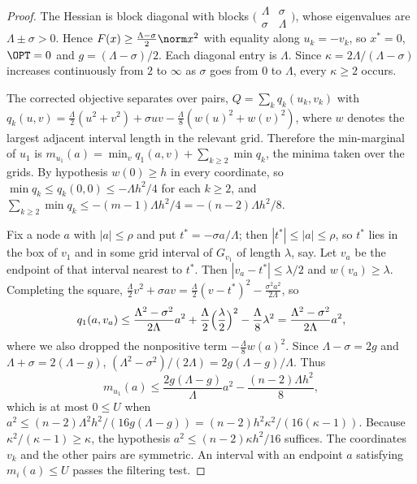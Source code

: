 \begin{proof}
The Hessian is block diagonal with blocks
$\bigl(\begin{smallmatrix}\Lambda&\sigma\\\sigma&\Lambda\end{smallmatrix}\bigr)$,
whose eigenvalues are $\Lambda\pm\sigma>0$. Hence $F(x)\ge\frac{\Lambda-\sigma}2
\norm x^2$ with equality along $u_k=-v_k$, so $x^*=0$, $\OPT=0$ and
$g=(\Lambda-\sigma)/2$. Each diagonal entry is $\Lambda$. Since
$\kappa=2\Lambda/(\Lambda-\sigma)$ increases continuously from $2$ to
$\infty$ as $\sigma$ goes from $0$ to $\Lambda$, every $\kappa\ge2$ occurs.

The corrected objective separates over pairs,
$Q=\sum_kq_k(u_k,v_k)$ with
$q_k(u,v)=\frac\Lambda2(u^2+v^2)+\sigma uv-\frac\Lambda8(w(u)^2+w(v)^2)$,
where $w$ denotes the largest adjacent interval length in the relevant
grid. Therefore the min-marginal of $u_1$ is
$m_{u_1}(a)=\min_vq_1(a,v)+\sum_{k\ge2}\min q_k$, the minima taken over the
grids. By hypothesis $w(0)\ge h$ in every coordinate, so
$\min q_k\le q_k(0,0)\le-\Lambda h^2/4$ for each $k\ge2$, and
$\sum_{k\ge2}\min q_k\le-(m-1)\Lambda h^2/4=-(n-2)\Lambda h^2/8$.

Fix a node $a$ with $|a|\le\rho$ and put $t^*=-\sigma a/\Lambda$; then
$|t^*|\le|a|\le\rho$, so $t^*$ lies in the box of $v_1$ and in some grid
interval of $G_{v_1}$ of length $\lambda$, say. Let $v_a$ be the endpoint of
that interval nearest to $t^*$. Then $|v_a-t^*|\le\lambda/2$ and
$w(v_a)\ge\lambda$. Completing the square,
$\frac\Lambda2v^2+\sigma av=\frac\Lambda2(v-t^*)^2-\frac{\sigma^2a^2}{2\Lambda}$,
so
\[
q_1(a,v_a)\le\frac{\Lambda^2-\sigma^2}{2\Lambda}a^2
+\frac\Lambda2\Bigl(\frac\lambda2\Bigr)^2-\frac\Lambda8\lambda^2
=\frac{\Lambda^2-\sigma^2}{2\Lambda}a^2 ,
\]
where we also dropped the nonpositive term $-\frac\Lambda8w(a)^2$. Since
$\Lambda-\sigma=2g$ and $\Lambda+\sigma=2(\Lambda-g)$,
$(\Lambda^2-\sigma^2)/(2\Lambda)=2g(\Lambda-g)/\Lambda$. Thus
\[
m_{u_1}(a)\le\frac{2g(\Lambda-g)}{\Lambda}a^2-\frac{(n-2)\Lambda h^2}8,
\]
which is at most $0\le U$ when
$a^2\le(n-2)\Lambda^2h^2/(16g(\Lambda-g))=(n-2)h^2\kappa^2/(16(\kappa-1))$.
Because $\kappa^2/(\kappa-1)\ge\kappa$, the hypothesis
$a^2\le(n-2)\kappa h^2/16$ suffices. The coordinates $v_k$ and the other
pairs are symmetric. An interval with an endpoint $a$ satisfying
$m_i(a)\le U$ passes the filtering test.
\end{proof}

